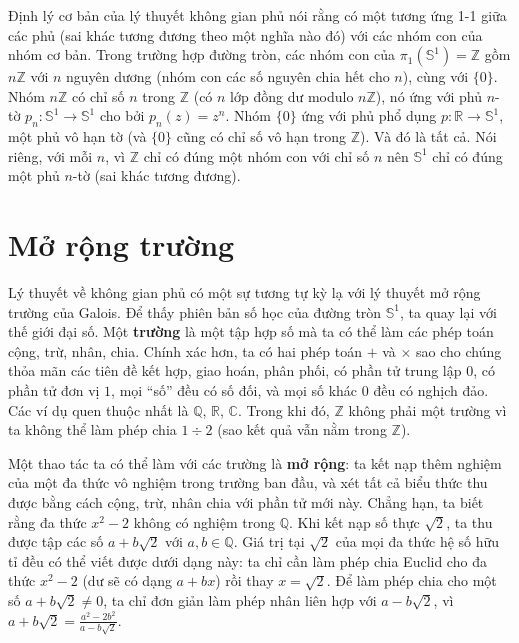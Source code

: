 \documentclass[12pt]{article}
\begin{document}
Định lý cơ bản của lý thuyết không gian phủ nói rằng có một tương ứng 1-1 giữa các phủ (sai khác tương đương theo một nghĩa nào đó) với các nhóm con của nhóm cơ bản. Trong trường hợp đường tròn, các nhóm con của $\pi_1(\mathbb{S}^1) = \mathbb{Z}$ gồm $n\mathbb{Z}$ với $n$ nguyên dương (nhóm con các số nguyên chia hết cho $n$), cùng với $\{0\}$. Nhóm $n\mathbb{Z}$ có chỉ số $n$ trong $\mathbb{Z}$ (có $n$ lớp đồng dư modulo $n\mathbb{Z}$), nó ứng với phủ $n$-tờ $p_n: \mathbb{S}^1 \to \mathbb{S}^1$ cho bởi $p_n(z) = z^n$. Nhóm $\{0\}$ ứng với phủ phổ dụng $p: \mathbb{R} \to \mathbb{S}^1$, một phủ vô hạn tờ (và $\{0\}$ cũng có chỉ số vô hạn trong $\mathbb{Z}$). Và đó là tất cả. Nói riêng, với mỗi $n$, vì $\mathbb{Z}$ chỉ có đúng một nhóm con với chỉ số $n$ nên $\mathbb{S}^1$ chỉ có đúng một phủ $n$-tờ (sai khác tương đương).




\section{Mở rộng trường}

Lý thuyết về không gian phủ có một sự tương tự kỳ lạ với lý thuyết mở rộng trường của Galois. Để thấy phiên bản số học của đường tròn $\mathbb{S}^1$, ta quay lại với thế giới đại số. Một {\bf trường} là một tập hợp số mà ta có thể làm các phép toán cộng, trừ, nhân, chia. Chính xác hơn, ta có hai phép toán $+$ và $\times$ sao cho chúng thỏa mãn các tiên đề kết hợp, giao hoán, phân phối, có phần tử trung lập $0$, có phần tử đơn vị $1$, mọi ``số'' đều có số đối, và mọi số khác $0$ đều có nghịch đảo. Các ví dụ quen thuộc nhất là $\mathbb{Q}$, $\mathbb{R}$, $\mathbb{C}$. Trong khi đó, $\mathbb{Z}$ không phải một trường vì ta không thể làm phép chia $1 \div 2$ (sao kết quả vẫn nằm trong $\mathbb{Z}$).

Một thao tác ta có thể làm với các trường là {\bf mở rộng}: ta kết nạp thêm nghiệm của một đa thức vô nghiệm trong trường ban đầu, và xét tất cả biểu thức thu được bằng cách cộng, trừ, nhân chia với phần tử mới này. Chẳng hạn, ta biết rằng đa thức $x^2 - 2$ không có nghiệm trong $\mathbb{Q}$. Khi kết nạp số thực $\sqrt{2}$, ta thu được tập các số $a + b\sqrt{2}$ với $a,b \in \mathbb{Q}$. Giá trị tại $\sqrt{2}$ của mọi đa thức hệ số hữu tỉ đều có thể viết được dưới dạng này: ta chỉ cần làm phép chia Euclid cho đa thức $x^2 - 2$ (dư sẽ có dạng $a + bx$) rồi thay $x = \sqrt{2}$. Để làm phép chia cho một số $a+b\sqrt{2} \neq 0$, ta chỉ đơn giản làm phép nhân liên hợp với $a-b\sqrt{2}$, vì $a+b\sqrt{2} = \frac{a^2 - 2b^2}{a-b\sqrt{2}}$. 
\end{document}
